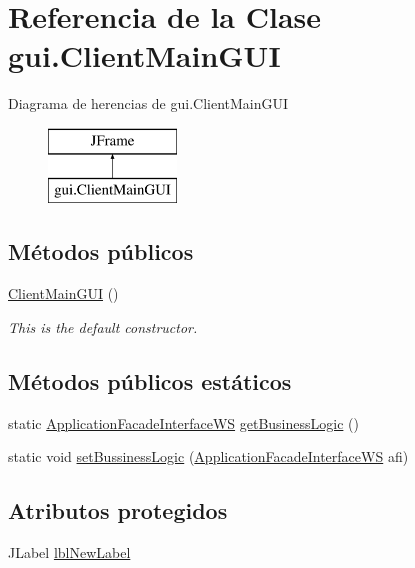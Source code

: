 \hypertarget{classgui_1_1_client_main_g_u_i}{}\section{Referencia de la Clase gui.\+Client\+Main\+G\+UI}
\label{classgui_1_1_client_main_g_u_i}
Diagrama de herencias de gui.\+Client\+Main\+G\+UI\begin{figure}[H]
\begin{center}
\leavevmode
\includegraphics[height=2.000000cm]{classgui_1_1_client_main_g_u_i}
\end{center}
\end{figure}
\subsection*{Métodos públicos}
\begin{DoxyCompactItemize}
\item 
\mbox{\hyperlink{classgui_1_1_client_main_g_u_i_a29652761456e31647cfa7f9843878a07}{Client\+Main\+G\+UI}} ()
\begin{DoxyCompactList}\small\item\em This is the default constructor. \end{DoxyCompactList}\end{DoxyCompactItemize}
\subsection*{Métodos públicos estáticos}
\begin{DoxyCompactItemize}
\item 
static \mbox{\hyperlink{interfacebusiness_logic_1_1_application_facade_interface_w_s}{Application\+Facade\+Interface\+WS}} \mbox{\hyperlink{classgui_1_1_client_main_g_u_i_a66e91e37a334a0d931f9a448e032091c}{get\+Business\+Logic}} ()
\item 
static void \mbox{\hyperlink{classgui_1_1_client_main_g_u_i_adac6e82dffe9f7df0f185583970bf40f}{set\+Bussiness\+Logic}} (\mbox{\hyperlink{interfacebusiness_logic_1_1_application_facade_interface_w_s}{Application\+Facade\+Interface\+WS}} afi)
\end{DoxyCompactItemize}
\subsection*{Atributos protegidos}
\begin{DoxyCompactItemize}
\item 
J\+Label \mbox{\hyperlink{classgui_1_1_client_main_g_u_i_a3aa18457987ffd805e145460480b360e}{lbl\+New\+Label}}
\end{DoxyCompactItemize}
